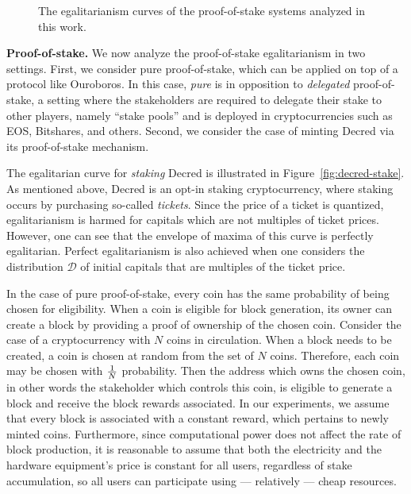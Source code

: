 \begin{figure}
  \caption{The egalitarianism curves of the proof-of-stake systems analyzed in this work.}
  \label{fig:egalitarian_curves_pos}
\end{figure}

\noindent\textbf{Proof-of-stake.}
\noindent
We now analyze the proof-of-stake egalitarianism in two settings. First, we
consider pure proof-of-stake, which can be applied on top of a protocol like
Ouroboros. In this case, \emph{pure} is in opposition to \emph{delegated}
proof-of-stake, a setting where the stakeholders are required to delegate their
stake to other players, namely ``stake pools'' and is deployed in
cryptocurrencies such as EOS, Bitshares, and others. Second, we consider the
case of minting Decred via its proof-of-stake mechanism.

The egalitarian curve for \emph{staking} Decred is illustrated in
Figure~\ref{fig:decred-stake}.
As mentioned above, Decred is an opt-in staking cryptocurrency, where staking
occurs by purchasing so-called \emph{tickets}. Since the price of a ticket is
quantized, egalitarianism is harmed for capitals which are not multiples of
ticket prices. However, one can see that the envelope of maxima of this curve
is perfectly egalitarian. Perfect egalitarianism is also achieved when one
considers the distribution $\mathcal{D}$ of initial capitals that are multiples
of the ticket price.

In the case of pure proof-of-stake, every coin has the same probability of
being chosen for eligibility. When a coin is eligible for block generation, its
owner can create a block by providing a proof of ownership of the chosen coin.
Consider the case of a cryptocurrency with $N$ coins in circulation. When a
block needs to be created, a coin is chosen at random from the set of $N$
coins. Therefore, each coin may be chosen with $1 \over N$ probability. Then
the address which owns the chosen coin, in other words the stakeholder which
controls this coin, is eligible to generate a block and receive the block
rewards associated. In our experiments, we assume that every block is
associated with a constant reward, which pertains to newly minted coins.
Furthermore, since computational power does not affect the rate of block
production, it is reasonable to assume that both the electricity and the
hardware equipment's price is constant for all users, regardless of stake
accumulation, so all users can participate using --- relatively --- cheap
resources.

